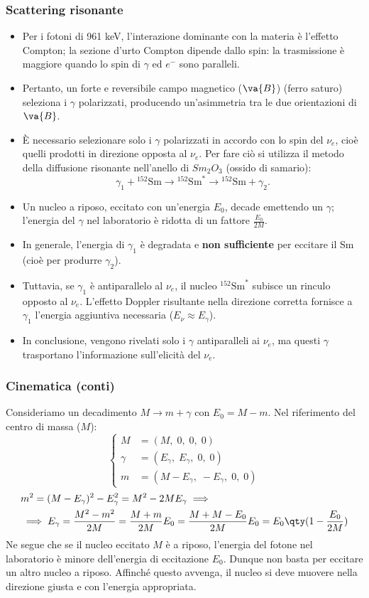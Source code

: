 \subsubsection{Scattering risonante}
\begin{itemize}
    \item Per i fotoni di 961 keV, l'interazione dominante con la materia è l'effetto Compton; la sezione d'urto Compton dipende dallo spin: la trasmissione è maggiore quando lo spin di \(\gamma\) ed \(e^-\) sono paralleli.  
    \item Pertanto, un forte e reversibile campo magnetico (\(\va{B}\)) (ferro saturo) seleziona i \(\gamma\) polarizzati, producendo un'asimmetria tra le due orientazioni di \(\va{B}\).
    \item  È necessario selezionare solo i \(\gamma\) polarizzati in accordo con lo spin del \(\nu_e\), cioè quelli prodotti in direzione opposta al \(\nu_e\). Per fare ciò si utilizza il metodo della diffusione risonante nell'anello di \(Sm_2O_3\) (ossido di samario):  
    \[
    \gamma_1 + {}^{152}\text{Sm} \to {}^{152}\text{Sm}^* \to {}^{152}\text{Sm} + \gamma_2.
    \]  
    \item Un nucleo a riposo, eccitato con un'energia \(E_0\), decade emettendo un \(\gamma\); l'energia del \(\gamma\) nel laboratorio è ridotta di un fattore \(\frac{E_0}{2M}\).
    \item In generale, l'energia di \(\gamma_1\) è degradata e \textbf{non sufficiente} per eccitare il Sm (cioè per produrre \(\gamma_2\)).  
    \item Tuttavia, se \(\gamma_1\) è antiparallelo al \(\nu_e\), il nucleo \({}^{152}\text{Sm}^*\) subisce un rinculo opposto al \(\nu_e\). L'effetto Doppler risultante nella direzione corretta fornisce a \(\gamma_1\) l'energia aggiuntiva necessaria (\(E_\nu \approx E_\gamma\)).  
    \item In conclusione, vengono rivelati solo i \(\gamma\) antiparalleli ai \(\nu_e\), ma questi \(\gamma\) trasportano l'informazione sull'elicità del \(\nu_e\).
\end{itemize}
\subsubsection{Cinematica (conti)}
Consideriamo un decadimento $M\to m+\gamma$ con $E_0=M-m$. Nel riferimento del centro di massa ($M$):
\[
\begin{cases}
    M      &= (M,\;0,\;0,\;0)\\
    \gamma &= (E_\gamma,\;E_\gamma,\;0,\;0)\\
    m      &= (M-E_\gamma,\;-E_\gamma,\;0,\;0)
\end{cases}
\]
\begin{align*}
&m^2=(M-E_\gamma)^2-E_\gamma^2=M^2-2ME_\gamma\implies\\
&\implies E_\gamma=\frac{M^2-m^2}{2M}=\frac{M+m}{2M}E_0=\frac{M+M-E_0}{2M}E_0=E_0\qty(1-\frac{E_0}{2M})
\end{align*}
Ne segue che se il nucleo eccitato $M$ è a riposo, l'energia del fotone nel laboratorio è minore dell'energia di eccitazione $E_0$. Dunque non basta per eccitare un altro nucleo a riposo. Affinché questo avvenga, il nucleo si deve muovere nella direzione giusta e con l'energia appropriata.
